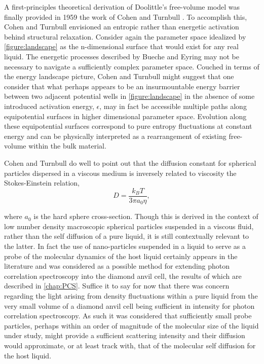 A first-principles theoretical derivation of Doolittle's free-volume model was finally provided in 1959 \via the work of Cohen and Turnbull \nolinebreak\cite{Cohen}. To accomplish this, Cohen and Turnbull envisioned an entropic rather than energetic activation behind structural relaxation. Consider again the parameter space idealized by \fig \nolinebreak \ref{figure:landscape} as the n-dimensional surface that would exist for any real liquid.  The energetic processes described by Bueche and Eyring may not be necessary to navigate a sufficiently complex parameter space.  Couched in terms of the energy landscape picture, Cohen and Turnbull might suggest that one consider that what perhaps appears to be an insurmountable energy barrier between two adjacent potential wells in \fig \nolinebreak \ref{figure:landscape} in the absence of some introduced activation energy, $\epsilon$, may in fact be accessible \via multiple paths along equipotential surfaces in higher dimensional parameter space.  Evolution along these equipotential surfaces correspond to pure entropy fluctuations at constant energy and can be physically interpreted as a rearrangement of existing free-volume within the bulk material.  

Cohen and Turnbull do well to point out that the diffusion constant for spherical particles dispersed in a viscous medium is inversely related to viscosity \via the Stokes-Einstein relation,
\begin{equation}
	D=\frac{k_B T}{3\pi a_0 \eta},
	\label{eqn:StokesEinstien}
\end{equation}

\noindent where $a_0$ is the hard sphere cross-section.  Though this is derived in the context of low number density macroscopic spherical particles suspended in a viscous fluid, rather than the self diffusion of a pure liquid, it is still contextually relevant to the latter.  In fact the use of nano-particles suspended in a liquid to serve as a probe of the molecular dynamics of the host liquid certainly appears in the literature and was considered as a possible method for extending photon correlation spectroscopy into the diamond anvil cell, the results of which are described in \chap\nolinebreak \ref{chap:PCS}.  Suffice it to say for now that there was concern regarding the light arising from density fluctuations  within a pure liquid from the very small volume of a diamond anvil cell being sufficient in intensity for photon correlation spectroscopy.  As such it was considered that sufficiently small probe particles, perhaps within an order of magnitude of the molecular size of the liquid under study, might provide a sufficient scattering intensity and their diffusion would approximate, or at least track with, that of the molecular self diffusion for the host liquid.  

